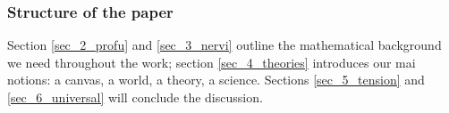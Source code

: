 \subsubsection*{Structure of the paper}
Section \ref{sec_2_profu} and \ref{sec_3_nervi} outline the mathematical background we need throughout the work; section \ref{sec_4_theories} introduces our mai notions: a canvas, a world, a theory, a science. Sections \ref{sec_5_tension} and \ref{sec_6_universal} will conclude the discussion.%